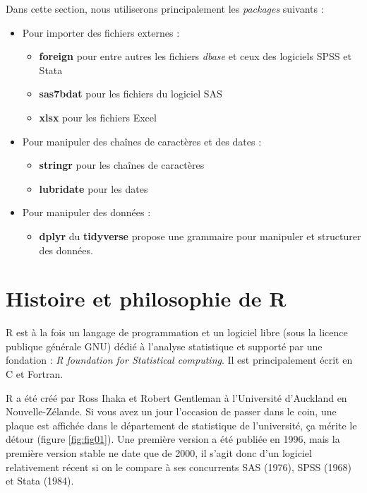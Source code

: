 \documentclass[
  11pt,
  french,
]{book}
\makeatletter
\providecommand{\tightlist}{%
  \setlength{\itemsep}{0pt}\setlength{\parskip}{0pt}}
\newenvironment{kframev}{%
\medskip{}
\setlength{\fboxsep}{.8em}
 \def\at@end@of@kframev{}%
 \ifinner\ifhmode%
  \def\at@end@of@kframev{\end{minipage}}%
  \begin{minipage}{\columnwidth}%
 \fi\fi%
 \def\FrameCommand##1{\hskip\@totalleftmargin \hskip-\fboxsep
 \colorbox{shadebluecolor}{##1}\hskip-\fboxsep
     \hskip-\linewidth \hskip-\@totalleftmargin \hskip\columnwidth}%
 \MakeFramed {\advance\hsize-\width
   \@totalleftmargin\z@ \linewidth\hsize
   \@setminipage}}%
 {\par\unskip\endMakeFramed%
 \at@end@of@kframev}
\newenvironment{rmdblock}[1]
  {
  \begin{itemize}
  \renewcommand{\labelitemi}{
    \raisebox{-.7\height}[0pt][0pt]{
      {\setkeys{Gin}{width=3em,keepaspectratio}\texttt{[image: images/\#1]}}
    }
  }
  \setlength{\fboxsep}{1em}
  \begin{kframev}
  \small
  \item
  }
  {
  \end{kframev}
  \end{itemize}
  }
\newenvironment{bloc_package}
  {\begin{rmdblock}{package}}
  {\end{rmdblock}}
\makeatother
\begin{document}
\begin{bloc_package}

Dans cette section, nous utiliserons principalement les \emph{packages} suivants :

\begin{itemize}
\tightlist
\item
  Pour importer des fichiers externes :

  \begin{itemize}
  \tightlist
  \item
    \textbf{foreign} pour entre autres les fichiers \emph{dbase} et ceux des logiciels SPSS et Stata
  \item
    \textbf{sas7bdat} pour les fichiers du logiciel SAS
  \item
    \textbf{xlsx} pour les fichiers Excel
  \end{itemize}
\item
  Pour manipuler des chaînes de caractères et des dates :

  \begin{itemize}
  \tightlist
  \item
    \textbf{stringr} pour les chaînes de caractères
  \item
    \textbf{lubridate} pour les dates
  \end{itemize}
\item
  Pour manipuler des données :

  \begin{itemize}
  \tightlist
  \item
    \textbf{dplyr } du \textbf{tidyverse} propose une grammaire pour manipuler et structurer des données.
  \end{itemize}
\end{itemize}

\end{bloc_package}

\hypertarget{sect011}{%
\section{Histoire et philosophie de R}\label{sect011}}

R est à la fois un langage de programmation et un logiciel libre (sous la licence publique générale GNU) dédié à l'analyse statistique et supporté par une fondation : \emph{R foundation for Statistical computing}. Il est principalement écrit en C et Fortran.

R a été créé par Ross Ihaka et Robert Gentleman à l'Université d'Auckland en Nouvelle-Zélande. Si vous avez un jour l'occasion de passer dans le coin, une plaque est affichée dans le département de statistique de l'université, ça mérite le détour (figure \ref{fig:fig01}). Une première version a été publiée en 1996, mais la première version stable ne date que de 2000, il s'agit donc d'un logiciel relativement récent si on le compare à ses concurrents SAS (1976), SPSS (1968) et Stata (1984).
\end{document}
